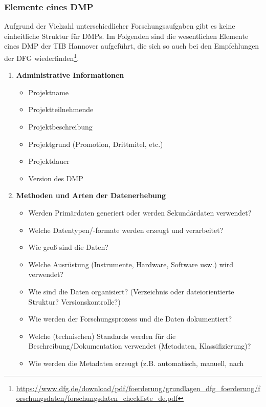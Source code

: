 \subsubsection{Elemente eines DMP}

Aufgrund der Vielzahl unterschiedlicher Forschungsaufgaben gibt es keine
einheitliche Struktur für DMPs. Im Folgenden sind die wesentlichen Elemente
eines DMP der TIB Hannover aufgeführt, die sich so auch bei den Empfehlungen der
DFG wiederfinden\footnote{\url{https://www.dfg.de/download/pdf/foerderung/grundlagen_dfg_foerderung/forschungsdaten/forschungsdaten_checkliste_de.pdf}}.\\


\begin{enumerate}[start=0, label=\textbf{\arabic*})]
  \item \textbf{Administrative Informationen}
        \begin{itemize}
          \item Projektname
          \item Projektteilnehmende
          \item Projektbeschreibung
          \item Projektgrund (Promotion, Drittmitel, etc.)
          \item Projektdauer
          \item Version des DMP
        \end{itemize}
  \item \textbf{Methoden und Arten der Datenerhebung}
        \begin{itemize}
          \item Werden Primärdaten generiert oder werden Sekundärdaten verwendet?
        \item Welche Datentypen/-formate werden erzeugt und verarbeitet?
        \item Wie groß sind die Daten?
        \item Welche Ausrüstung (Instrumente, Hardware, Software usw.) wird
              verwendet?
        \item Wie sind die Daten organisiert? (Verzeichnis oder dateiorientierte
              Struktur? Versionskontrolle?)
        \item Wie werden der Forschungsprozess und die Daten dokumentiert?
        \item Welche (technischen) Standards werden für die
              Beschreibung/Dokumentation verwendet (Metadaten, Klassifizierung)?
        \item Wie werden die Metadaten erzeugt (z.B. automatisch, manuell, nach

\end{itemize}
\end{enumerate}
